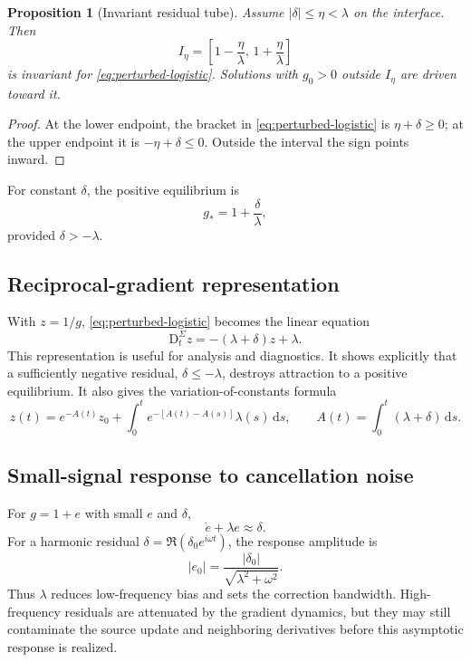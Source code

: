 \documentclass[11pt,a4paper]{article}
\newtheorem{proposition}[theorem]{Proposition}
\theoremstyle{definition}
\theoremstyle{remark}
\newcommand{\abs}[1]{\left\lvert #1\right\rvert}
\newcommand{\material}{\mathrm{D}_t}
\begin{document}
\begin{proposition}[Invariant residual tube]
Assume $\abs{\delta}\le\eta<\lambda$ on the interface. Then
\begin{equation}
  I_\eta=\left[1-\frac{\eta}{\lambda},\,1+\frac{\eta}{\lambda}\right]
  \label{eq:residual-tube}
\end{equation}
is invariant for \eqref{eq:perturbed-logistic}. Solutions with $g_0>0$ outside $I_\eta$ are driven toward it.
\end{proposition}

\begin{proof}
At the lower endpoint, the bracket in \eqref{eq:perturbed-logistic} is $\eta+\delta\ge0$; at the upper endpoint it is $-\eta+\delta\le0$. Outside the interval the sign points inward.
\end{proof}

For constant $\delta$, the positive equilibrium is
\begin{equation}
  g_*=1+\frac{\delta}{\lambda},
  \label{eq:constant-delta-equilibrium}
\end{equation}
provided $\delta> -\lambda$.

\subsection{Reciprocal-gradient representation}

With $z=1/g$, \eqref{eq:perturbed-logistic} becomes the linear equation
\begin{equation}
  \material^{\Sigma}z=-(\lambda+\delta)z+\lambda.
  \label{eq:z-linear}
\end{equation}
This representation is useful for analysis and diagnostics. It shows explicitly that a sufficiently negative residual, $\delta\le-\lambda$, destroys attraction to a positive equilibrium. It also gives the variation-of-constants formula
\begin{equation}
  z(t)=e^{-A(t)}z_0+\int_0^t e^{-[A(t)-A(s)]}\lambda(s)\,\mathrm ds,
  \qquad
  A(t)=\int_0^t(\lambda+\delta)\,\mathrm ds.
\end{equation}

\subsection{Small-signal response to cancellation noise}

For $g=1+e$ with small $e$ and $\delta$,
\begin{equation}
  \dot e+\lambda e\approx\delta.
  \label{eq:linear-noise}
\end{equation}
For a harmonic residual $\delta=\Re(\delta_0e^{i\omega t})$, the response amplitude is
\begin{equation}
  \abs{e_0}=\frac{\abs{\delta_0}}{\sqrt{\lambda^2+\omega^2}}.
\end{equation}
Thus $\lambda$ reduces low-frequency bias and sets the correction bandwidth. High-frequency residuals are attenuated by the gradient dynamics, but they may still contaminate the source update and neighboring derivatives before this asymptotic response is realized.
\end{document}
